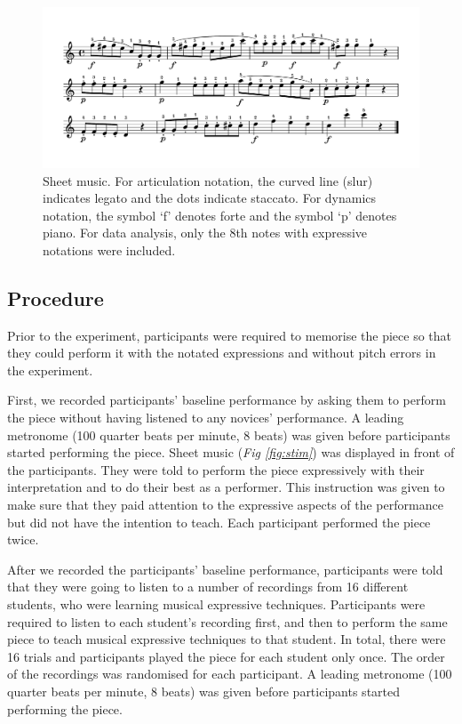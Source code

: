 \documentclass[
  man,floatsintext]{apa6}
\begin{document}
\begin{figure}
\includegraphics[width=1\linewidth]{manuscript_files/figure-latex/stimli-1} \caption{\label{fig:stim}Sheet music. For articulation notation, the curved line (slur) indicates legato and the dots indicate staccato. For dynamics notation, the symbol `f' denotes forte and the symbol `p' denotes piano. For data analysis, only the 8th notes with expressive notations were included.}\label{fig:stimli}
\end{figure}

\hypertarget{procedure}{%
\subsection{Procedure}\label{procedure}}

Prior to the experiment, participants were required to memorise the piece so that they could perform it with the notated expressions and without pitch errors in the experiment.

First, we recorded participants' baseline performance by asking them to perform the piece without having listened to any novices' performance. A leading metronome (100 quarter beats per minute, 8 beats) was given before participants started performing the piece. Sheet music (\emph{Fig \ref{fig:stim}}) was displayed in front of the participants. They were told to perform the piece expressively with their interpretation and to do their best as a performer. This instruction was given to make sure that they paid attention to the expressive aspects of the performance but did not have the intention to teach. Each participant performed the piece twice.

After we recorded the participants' baseline performance, participants were told that they were going to listen to a number of recordings from 16 different students, who were learning musical expressive techniques. Participants were required to listen to each student's recording first, and then to perform the same piece to teach musical expressive techniques to that student. In total, there were 16 trials and participants played the piece for each student only once. The order of the recordings was randomised for each participant. A leading metronome (100 quarter beats per minute, 8 beats) was given before participants started performing the piece.
\end{document}
